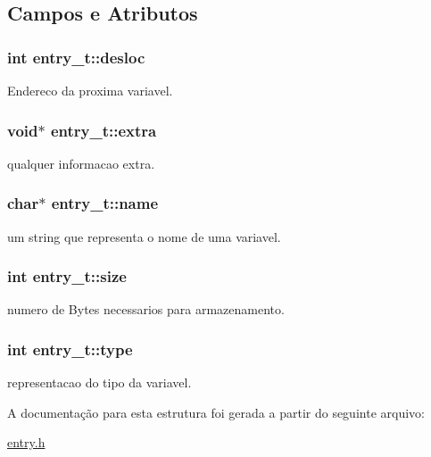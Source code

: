 \subsection{Campos e Atributos}
\hypertarget{structentry__t_abc62dec01315bbb72bff20ce69d8ef37}{
\subsubsection[{desloc}]{\setlength{\rightskip}{0pt plus 5cm}int {\bf entry\_\-t::desloc}}}
\label{structentry__t_abc62dec01315bbb72bff20ce69d8ef37}
Endereco da proxima variavel. \hypertarget{structentry__t_a6f7a7b18bd57fafba8d1f2d257ac3863}{
\subsubsection[{extra}]{\setlength{\rightskip}{0pt plus 5cm}void$\ast$ {\bf entry\_\-t::extra}}}
\label{structentry__t_a6f7a7b18bd57fafba8d1f2d257ac3863}
qualquer informacao extra. \hypertarget{structentry__t_ab04f7c44381c01e411be318875eb5eb6}{
\subsubsection[{name}]{\setlength{\rightskip}{0pt plus 5cm}char$\ast$ {\bf entry\_\-t::name}}}
\label{structentry__t_ab04f7c44381c01e411be318875eb5eb6}
um string que representa o nome de uma variavel. \hypertarget{structentry__t_a67460ae77b6a4433d48f7736ee6a500a}{
\subsubsection[{size}]{\setlength{\rightskip}{0pt plus 5cm}int {\bf entry\_\-t::size}}}
\label{structentry__t_a67460ae77b6a4433d48f7736ee6a500a}
numero de Bytes necessarios para armazenamento. \hypertarget{structentry__t_af284680fed934779f16fc2b6a42101b1}{
\subsubsection[{type}]{\setlength{\rightskip}{0pt plus 5cm}int {\bf entry\_\-t::type}}}
\label{structentry__t_af284680fed934779f16fc2b6a42101b1}
representacao do tipo da variavel. 

A documentação para esta estrutura foi gerada a partir do seguinte arquivo:\begin{DoxyCompactItemize}
\item 
\hyperlink{entry_8h}{entry.h}\end{DoxyCompactItemize}
